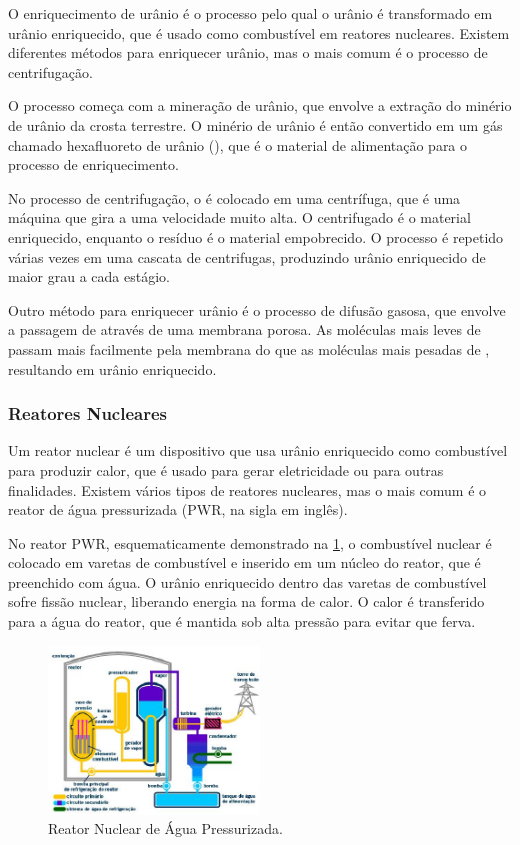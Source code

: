\documentclass[11pt,a4paper]{article}
\begin{document}
    O enriquecimento de urânio é o processo pelo qual o urânio é transformado em urânio enriquecido, que é usado como combustível em reatores nucleares. Existem diferentes métodos para enriquecer urânio, mas o mais comum é o processo de centrifugação.

    O processo começa com a mineração de urânio, que envolve a extração do minério de urânio da crosta terrestre. O minério de urânio é então convertido em um gás chamado hexafluoreto de urânio (), que é o material de alimentação para o processo de enriquecimento.
                
    No processo de centrifugação, o  é colocado em uma centrífuga, que é uma máquina que gira a uma velocidade muito alta. O centrifugado é o material enriquecido, enquanto o resíduo é o material empobrecido. O processo é repetido várias vezes em uma cascata de centrifugas, produzindo urânio enriquecido de maior grau a cada estágio.
                
    Outro método para enriquecer urânio é o processo de difusão gasosa, que envolve a passagem de  através de uma membrana porosa. As moléculas mais leves de  passam mais facilmente pela membrana do que as moléculas mais pesadas de , resultando em urânio enriquecido.

\subsubsection*{Reatores Nucleares}

    Um reator nuclear é um dispositivo que usa urânio enriquecido como combustível para produzir calor, que é usado para gerar eletricidade ou para outras finalidades. Existem vários tipos de reatores nucleares, mas o mais comum é o reator de água pressurizada (PWR, na sigla em inglês).

    No reator PWR, esquematicamente demonstrado na \ref{fig:reatorNuclear}, o combustível nuclear é colocado em varetas de combustível e inserido em um núcleo do reator, que é preenchido com água. O urânio enriquecido dentro das varetas de combustível sofre fissão nuclear, liberando energia na forma de calor. O calor é transferido para a água do reator, que é mantida sob alta pressão para evitar que ferva.
                

                    \begin{figure}[h]
                        \centering
                        \includegraphics[width=0.5\textwidth]{Imagens/reatorNuclear.jpg}
                        \caption{Reator Nuclear de Água Pressurizada.}
                        \label{fig:reatorNuclear}
                    \end{figure}
\end{document}
